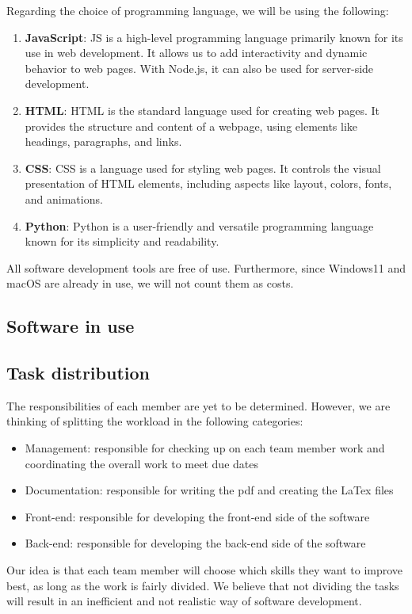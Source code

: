 \documentclass[conference]{IEEEtran}
\begin{document}
\vspace{12pt}
Regarding the choice of programming language, we will be using the following:
\begin{enumerate}
    \item \textbf{JavaScript}: JS is a high-level programming language primarily known for its use in web development. It allows us to add interactivity and dynamic behavior to web pages. With Node.js, it can also be used for server-side development.
    \item \textbf{HTML}: HTML is the standard language used for creating web pages. It provides the structure and content of a webpage, using elements like headings, paragraphs, and links.
    \item \textbf{CSS}: CSS is a language used for styling web pages. It controls the visual presentation of HTML elements, including aspects like layout, colors, fonts, and animations.
    \item \textbf{Python}: Python is a user-friendly and versatile programming language known for its simplicity and readability.
\end{enumerate}

\vspace{12pt}
All software development tools are free of use. Furthermore, since Windows11 and macOS are already in use, we will not count them as costs.

\subsection{Software in use}

\subsection{Task distribution}
The responsibilities of each member are yet to be determined. However, we are thinking of splitting the workload in the following categories:
\begin{itemize}
    \item Management: responsible for checking up on each team member work and coordinating the overall work to meet due dates
    \item Documentation: responsible for writing the pdf and creating the LaTex files
    \item Front-end: responsible for developing the front-end side of the software
    \item Back-end: responsible for developing the back-end side of the software
\end{itemize}
Our idea is that each team member will choose which skills they want to improve best, as long as the work is fairly divided. We believe that not dividing the tasks will result in an inefficient and not realistic way of software development.
\end{document}
